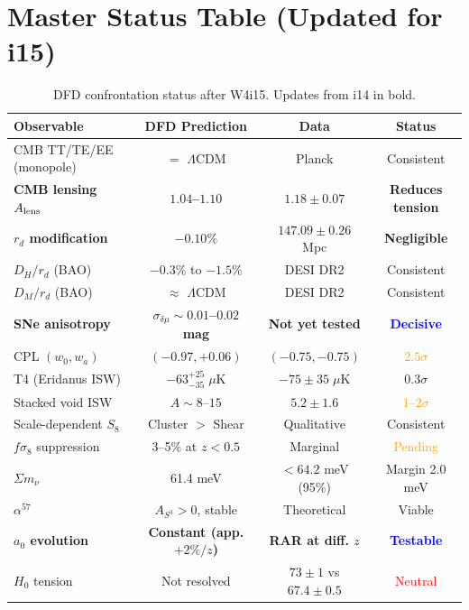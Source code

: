 \documentclass[11pt,a4paper]{article}
\newcommand{\LCDM}{$\Lambda$CDM}
\begin{document}
\section{Master Status Table (Updated for i15)}
\label{sec:status}

\begin{table}[H]
\centering
\caption{DFD confrontation status after W4i15.  Updates from i14 in bold.}
\label{tab:status-i15}
\small
\begin{tabular}{lccc}
\toprule
\textbf{Observable} & \textbf{DFD Prediction} &
\textbf{Data} & \textbf{Status} \\
\midrule
CMB TT/TE/EE (monopole) & $=$ \LCDM & Planck &
  \textcolor{green!60!black}{Consistent} \\
\textbf{CMB lensing $A_{\rm lens}$} & \textbf{$1.04$--$1.10$} &
  $1.18 \pm 0.07$ &
  \textbf{\textcolor{green!60!black}{Reduces tension}} \\
\textbf{$r_d$ modification} & \textbf{$-0.10\%$} &
  $147.09 \pm 0.26$ Mpc &
  \textbf{\textcolor{green!60!black}{Negligible}} \\
$D_H/r_d$ (BAO) & $-0.3\%$ to $-1.5\%$ & DESI DR2 &
  \textcolor{green!60!black}{Consistent} \\
$D_M/r_d$ (BAO) & $\approx$ \LCDM & DESI DR2 &
  \textcolor{green!60!black}{Consistent} \\
\textbf{SNe anisotropy} & \textbf{$\sigma_{\delta\mu} \sim 0.01$--$0.02$ mag} &
  \textbf{Not yet tested} &
  \textbf{\textcolor{blue}{Decisive}} \\
CPL $(w_0, w_a)$ & $(-0.97, +0.06)$ &
  $(-0.75, -0.75)$ & \textcolor{orange}{$2.5\sigma$} \\
T4 (Eridanus ISW) & $-63^{+25}_{-35}\;\mu$K &
  $-75 \pm 35\;\mu$K & \textcolor{green!60!black}{$0.3\sigma$} \\
Stacked void ISW & $A \sim 8$--$15$ &
  $5.2 \pm 1.6$ & \textcolor{orange}{$1$--$2\sigma$} \\
Scale-dependent $S_8$ & Cluster $>$ Shear &
  Qualitative & \textcolor{green!60!black}{Consistent} \\
$f\sigma_8$ suppression & 3--5\% at $z < 0.5$ &
  Marginal & \textcolor{orange}{Pending} \\
$\Sigma m_\nu$ & 61.4 meV &
  $< 64.2$ meV (95\%) & \textcolor{green!60!black}{Margin 2.0 meV} \\
$\alpha^{57}$ & $A_{S^3} > 0$, stable &
  Theoretical & \textcolor{green!60!black}{Viable} \\
\textbf{$a_0$ evolution} & \textbf{Constant (app. $+2\%/z$)} &
  \textbf{RAR at diff. $z$} &
  \textbf{\textcolor{blue}{Testable}} \\
$H_0$ tension & Not resolved &
  $73 \pm 1$ vs $67.4 \pm 0.5$ & \textcolor{red}{Neutral} \\
\bottomrule
\end{tabular}
\end{table}
\end{document}
